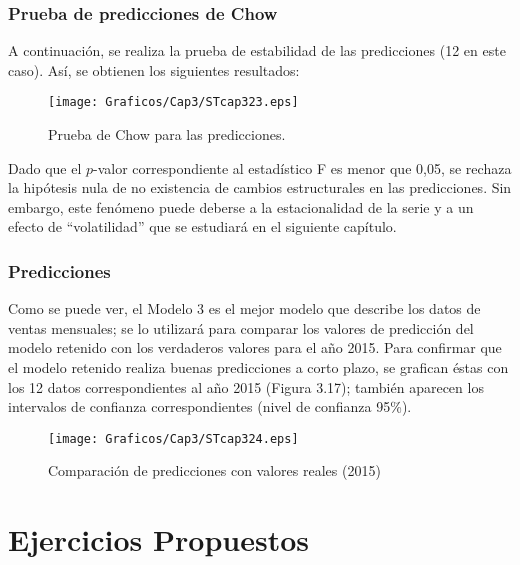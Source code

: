 \subsubsection*{Prueba de predicciones de Chow}

A continuaci\'{o}n, se realiza la prueba de estabilidad de las predicciones (12 en este caso). As\'{i}, se obtienen los siguientes resultados:

\begin{figure}[H]
\centering
\texttt{[image: Graficos/Cap3/STcap323.eps]}
\caption{Prueba de Chow para las predicciones.}
\end{figure}

Dado que el $p$-valor correspondiente al estad\'{i}stico F es menor que 0,05, se rechaza la hip\'{o}tesis nula de no existencia de cambios estructurales en las predicciones. Sin embargo, este fen\'{o}meno puede deberse a la estacionalidad de la serie y a un efecto de ``volatilidad'' que se estudiar\'{a} en el siguiente cap\'{i}tulo.

\subsubsection*{Predicciones}

Como se puede ver, el Modelo 3 es el mejor modelo que describe los datos de ventas mensuales; se lo utilizar\'{a} para comparar los valores de predicci\'{o}n del modelo retenido con los verdaderos valores para el a\~{n}o 2015. Para confirmar que el modelo retenido realiza buenas predicciones a corto plazo, se grafican \'{e}stas con los 12 datos correspondientes al a\~{n}o 2015 (Figura 3.17); tambi\'{e}n aparecen los intervalos de confianza correspondientes (nivel de confianza 95{\%}).

\begin{figure}[H]
\centering
\texttt{[image: Graficos/Cap3/STcap324.eps]}
\caption{Comparaci\'{o}n de predicciones con valores reales (2015)}
\end{figure}


\section{Ejercicios Propuestos}

